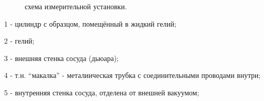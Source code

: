 \documentclass[12pt,a4paper]{article}
\begin{document}
\begin{figure}[H]
    \begin{center}
    \caption{схема измерительной установки.}
    \label{ust} 
    \end{center}
\end{figure}

 1 - цилиндр с образцом, помещённый в жидкий гелий;
 
 2 - гелий;
 
 3 - внешняя стенка сосуда (дьюара);
 
 4 - т.н. ``макалка'' - металиическая трубка с соединительными проводами внутри;
 
 5 - внутренняя стенка сосуда, отделена от внешней вакуумом;
 
\end{document}
